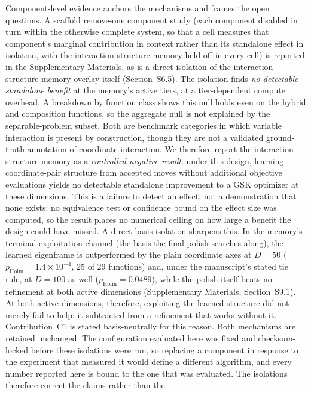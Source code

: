 Component-level evidence anchors the mechanisms and frames the open
questions. A scaffold remove-one
component study (each component disabled in turn within the otherwise
complete system, so that a cell measures that component's marginal
contribution in context rather than its standalone effect in isolation, with the
interaction-structure memory held off in
every cell) is reported in the Supplementary Materials, as is a
direct isolation of the interaction-structure memory overlay itself
(Section~S6.5). The isolation finds \emph{no detectable standalone
benefit} at the memory's active tiers, at a tier-dependent compute overhead.
A breakdown by function class shows this null holds even on the hybrid
and composition functions, so the aggregate null is not explained by the
separable-problem subset. Both are benchmark categories in which variable
interaction is present by construction, though they are not a validated
ground-truth annotation of coordinate interaction. We
therefore report the interaction-structure memory as a \emph{controlled
negative result}: under this design, learning coordinate-pair structure from accepted
moves without additional objective evaluations yields no detectable standalone
improvement to a GSK optimizer at these
dimensions. This is a failure to detect an effect, not a demonstration that
none exists: no equivalence test or confidence bound on the effect size was
computed, so the result places no numerical ceiling on how large a benefit the
design could have missed.
A direct basis isolation sharpens this. In the
memory's terminal exploitation channel (the basis the final polish searches
along), the learned eigenframe is outperformed by the plain coordinate axes at
$D = 50$ ($p_{\mathrm{Holm}} = 1.4\times10^{-4}$, 25 of 29 functions) and, under
the manuscript's stated tie rule, at $D = 100$ as well
($p_{\mathrm{Holm}} = 0.0489$), while the
polish itself beats no refinement at both active dimensions (Supplementary
Materials, Section~S9.1). At both active dimensions, therefore,
exploiting the learned structure did not merely fail to help: it subtracted from
a refinement that works without it. Contribution~C1 is stated basis-neutrally
for this reason.
Both mechanisms are retained unchanged. The configuration evaluated here was
fixed and checksum-locked before these isolations were run, so replacing a
component in response to the experiment that measured it would define a
different algorithm, and every number reported here is bound to the one that
was evaluated. The isolations therefore correct the claims rather than the
